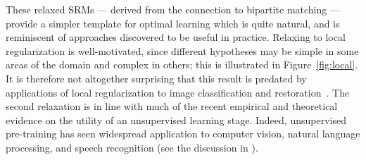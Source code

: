 These relaxed SRMs --- derived from the connection to bipartite matching --- provide a  simpler template for optimal learning which is quite natural, and is reminiscent of approaches discovered to be useful in practice. Relaxing to local regularization is well-motivated, since different hypotheses may be simple in some areas of the domain and complex in others; this is illustrated in Figure~\ref{fig:local}. It is therefore not altogether surprising that this result is predated by applications of local regularization to image classification and restoration~\cite{wolf_local_2008,prost_learning_2021}. The second relaxation is in line with much of the recent empirical and theoretical evidence on the utility of an unsupervised learning stage. Indeed, unsupervised pre-training has seen widespread application to  computer vision, natural language processing, and speech recognition (see the discussion in \cite{ge_provable_2024}). 



